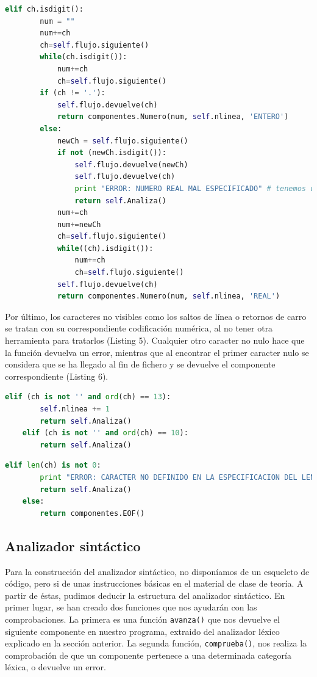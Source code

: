 \documentclass[11pt]{article}
\begin{document}
\begin{minipage}{\linewidth}
	\begin{lstlisting}[language=Python, caption=Detección de números]
		elif ch.isdigit():
		num = ""
		num+=ch
		ch=self.flujo.siguiente()
		while(ch.isdigit()):
			num+=ch
			ch=self.flujo.siguiente()
		if (ch != '.'):
			self.flujo.devuelve(ch)
			return componentes.Numero(num, self.nlinea, 'ENTERO')
		else:
			newCh = self.flujo.siguiente()
			if not (newCh.isdigit()):
				self.flujo.devuelve(newCh)
				self.flujo.devuelve(ch)
				print "ERROR: NUMERO REAL MAL ESPECIFICADO" # tenemos un comentario no abierto
				return self.Analiza()
			num+=ch
			num+=newCh
			ch=self.flujo.siguiente()
			while((ch).isdigit()):
				num+=ch
				ch=self.flujo.siguiente()
			self.flujo.devuelve(ch)
			return componentes.Numero(num, self.nlinea, 'REAL')
	\end{lstlisting}
\end{minipage}


Por último, los caracteres no visibles como los saltos de línea o retornos de carro se tratan con su correspondiente codificación numérica, al no tener otra herramienta para tratarlos (Listing 5). Cualquier otro caracter no nulo hace que la función devuelva un error, mientras que al encontrar el primer caracter nulo se considera que se ha llegado al fin de fichero y se devuelve el componente correspondiente (Listing 6).

\begin{lstlisting}[language=Python, caption=Caracteres no visibles]
	elif (ch is not '' and ord(ch) == 13):
    	self.nlinea += 1
    	return self.Analiza()
	elif (ch is not '' and ord(ch) == 10):
    	return self.Analiza()
\end{lstlisting}

\begin{lstlisting}[language=Python, caption=Errores y fin de fichero]
	elif len(ch) is not 0:
    	print "ERROR: CARACTER NO DEFINIDO EN LA ESPECIFICACION DEL LENGUAJE"
    	return self.Analiza()
	else:
    	return componentes.EOF()
\end{lstlisting}

\subsection{Analizador sintáctico}
Para la construcción del analizador sintáctico, no disponíamos de un esqueleto de código, pero si de unas instrucciones básicas en el material de clase de teoría. A partir de éstas, pudimos deducir la estructura del analizador sintáctico. En primer lugar, se han creado dos funciones que nos ayudarán con las comprobaciones. La primera es una función \lstinline[language=Python]{avanza()} que nos devuelve el siguiente componente en nuestro programa, extraido del analizador léxico explicado en la sección anterior. La segunda función, \lstinline[language=Python]{comprueba()}, nos realiza la comprobación de que un componente pertenece a una determinada categoría léxica, o devuelve un error. 
\end{document}
